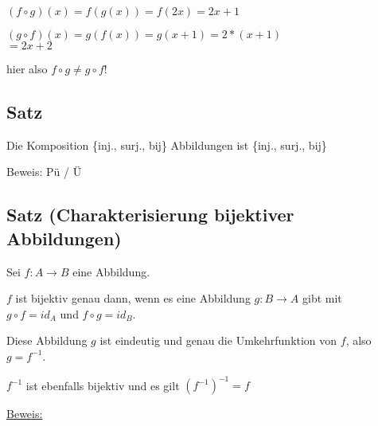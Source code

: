 \documentclass[a4paper, 12pt, twoside] {article}
\begin{document}
$(f \circ g) (x) = f(g(x)) = f(2x) = 2x+1$

$(g \circ f) (x) = g(f(x)) = g(x+1) = 2*(x+1)$ \\
$= 2x +2$

hier also $f \circ g \neq g \circ f$!

\subsection{Satz}
Die Komposition \{inj., surj., bij\} Abbildungen ist \{inj., surj., bij\}

Beweis: Pü / Ü

\subsection{Satz (Charakterisierung bijektiver Abbildungen)}

Sei $f \colon A \rightarrow B$ eine Abbildung.

$f$ ist bijektiv genau dann, wenn es eine Abbildung
$g \colon B \rightarrow A$ gibt mit \\
$g \circ f = id_{A}$ und  $f \circ g = id_{B}$.

Diese Abbildung $g$ ist eindeutig und genau die Umkehrfunktion von $f$, also \\
$g = f^{-1}$.

$f^{-1}$ ist ebenfalls bijektiv und es gilt $(f^{-1})^{-1} = f$

\underline{Beweis: }
\end{document}

